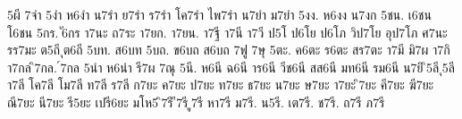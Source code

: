 {5ผี
7จำ
5งำ
ห6งำ
น7รำ
ย7รำ
ร7รำ
โค7รำ
ไพ7รำ
น7ยำ
ม7ยำ
5งง.
ห6งง
น7งก
5ชน.
เ6ชน
โ6ชน
5กร.
ั6กร
า7นะ
ถ7ระ
า7ยก.
า7ยน.
า7ฐี
า7นี
า7วี
ป5โ
ป6โย
ป6โภ
วิป7โย
อุป7โภ
ศ7นะ
รร7มะ
ต5ถี
ุต6ถี
5บท.
ส6บท
5บถ.
ข6บถ
ส6บถ
7ฟู
7ษุ
5ตะ.
ค6ตะ
ร6ตะ
สร7ตะ
า7มี
มิ7ผ
า7กิ
า7กล
ิ7กล.
์7กล
5นำ
ห6นำ
รี7ผ
7ณุ
5นี.
ห6นี
ฉ6นี
าร6นี
วีช6นี
สส6นี
มท6นี
รม6นี
น7ยิ
ิ5ลี
ุ5ลี
า7ลี
โค7ลี
โม7ลี
ท7ลี
ร7ลี
ก7ยะ
ค7ยะ
ป7ยะ
ท7ยะ
ธ7ยะ
น7ยะ
ษ7ยะ
า7ยะ
ิ7ยะ
คี7ยะ
ฆี7ยะ
ณี7ยะ
นี7ยะ
รี5ยะ
เปรี6ยะ
มโห5
ิ7รี
ี7รี
ู7รี
หา7รี
ม7รี.
น5รี.
เต7รี.
ช7รี.
ถ7รี
ภ7รี
}
